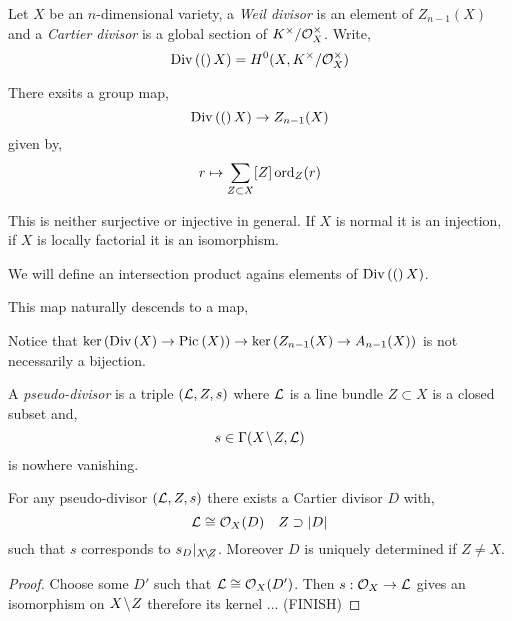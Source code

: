 \documentclass[12pt]{article}
\begin{document}
\begin{defn}
Let $X$ be an $n$-dimensional variety, a \textit{Weil divisor} is an element of $Z_{n-1}(X)$ and a \textit{Cartier divisor} is a global section of $K^\times / \mathcal{O}_{X}^\times$. Write,
\[ \mathrm{Div}\left( ( \right)X) = H^0(X, K^\times / \mathcal{O}_{X}^\times) \]
\end{defn}
 
\begin{prop}
There exsits a group map,
\[ \mathrm{Div}\left( ( \right)X) \to Z_{n-1}(X) \]
given by,
\[ r \mapsto \sum_{Z \subset X} [Z] \operatorname{\mathrm{ord}}_Z(r) \]
\end{prop}

\begin{rmk}
This is neither surjective or injective in general. If $X$ is normal it is an injection, if $X$ is locally factorial it is an isomorphism. 
\end{rmk}

\begin{rmk}
We will define an intersection product agains elements of $\mathrm{Div}\left( ( \right)X)$. 
\end{rmk}

\begin{rmk}
This map naturally descends to a map,
\begin{center}
\end{center}
Notice that $\ker{(\mathrm{Div}\left( X \right) \to \mathrm{Pic}^{} \left( X \right))} \to \ker{(Z_{n-1}(X) \to A_{n-1}(X))}$ is not necessarily a bijection.
\end{rmk}

\begin{defn}
A \textit{pseudo-divisor} is a triple $(\mathcal{L}, Z, s)$ where $\mathcal{L}$ is a line bundle $Z \subset X$ is a closed subset and,
\[ s \in \Gamma(X \! \setminus \! Z, \mathcal{L}) \]
is nowhere vanishing.  
\end{defn}

\begin{lemma}
For any pseudo-divisor $(\mathcal{L}, Z, s)$ there exists a Cartier divisor $D$ with,
\[ \mathcal{L} \cong \mathcal{O}_{X}(D) \quad Z \supset |D| \]
such that $s$ corresponds to $s_D |_{X \! \setminus \! Z}$. Moreover $D$ is uniquely determined if $Z \neq X$. 
\end{lemma}

\begin{proof}
Choose some $D'$ such that $\mathcal{L} \cong \mathcal{O}_{X}(D')$. Then $s : \mathcal{O}_{X} \to \mathcal{L}$ gives an isomorphism on $X \! \setminus \! Z$ therefore its kernel ... (FINISH) 
\end{proof}
\end{document}
